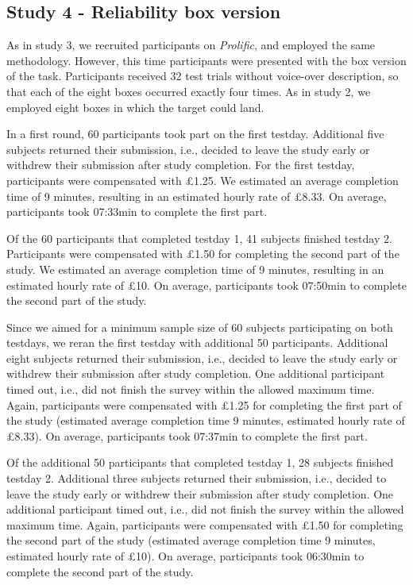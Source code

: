 \documentclass[
  man,floatsintext]{apa6}
\begin{document}
\hypertarget{study-4---reliability-box-version}{%
\subsection{Study 4 - Reliability box version}\label{study-4---reliability-box-version}}

As in study 3, we recruited participants on \emph{Prolific}, and employed the same methodology.
However, this time participants were presented with the box version of the task.
Participants received 32 test trials without voice-over description, so that each of the eight boxes occurred exactly four times.
As in study 2, we employed eight boxes in which the target could land.

In a first round, 60 participants took part on the first testday.
Additional five subjects returned their submission, i.e., decided to leave the study early or withdrew their submission after study completion.
For the first testday, participants were compensated with £1.25.
We estimated an average completion time of 9 minutes, resulting in an estimated hourly rate of £8.33.
On average, participants took 07:33min to complete the first part.

Of the 60 participants that completed testday 1, 41 subjects finished testday 2.
Participants were compensated with £1.50 for completing the second part of the study.
We estimated an average completion time of 9 minutes, resulting in an estimated hourly rate of £10.
On average, participants took 07:50min to complete the second part of the study.

Since we aimed for a minimum sample size of 60 subjects participating on both testdays, we reran the first testday with additional 50 participants.
Additional eight subjects returned their submission, i.e., decided to leave the study early or withdrew their submission after study completion.
One additional participant timed out, i.e., did not finish the survey within the allowed maximum time.
Again, participants were compensated with £1.25 for completing the first part of the study (estimated average completion time 9 minutes, estimated hourly rate of £8.33).
On average, participants took 07:37min to complete the first part.

Of the additional 50 participants that completed testday 1, 28 subjects finished testday 2.
Additional three subjects returned their submission, i.e., decided to leave the study early or withdrew their submission after study completion.
One additional participant timed out, i.e., did not finish the survey within the allowed maximum time.
Again, participants were compensated with £1.50 for completing the second part of the study (estimated average completion time 9 minutes, estimated hourly rate of £10).
On average, participants took 06:30min to complete the second part of the study.
\end{document}
